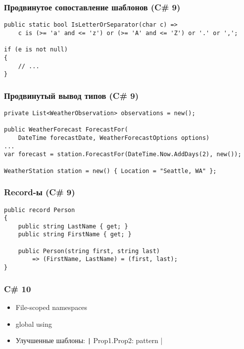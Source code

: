 \documentclass[xetex,mathserif,serif]{beamer}
\begin{document}
    \begin{frame}[fragile]
        \frametitle{Продвинутое сопоставление шаблонов (C\# 9)}
        \begin{verbatim}
public static bool IsLetterOrSeparator(char c) =>
    c is (>= 'a' and <= 'z') or (>= 'A' and <= 'Z') or '.' or ',';

if (e is not null)
{
    // ...
}
        \end{verbatim}
    \end{frame}

    \begin{frame}[fragile]
        \frametitle{Продвинутый вывод типов (C\# 9)}
        \begin{verbatim}
private List<WeatherObservation> observations = new();

public WeatherForecast ForecastFor(
    DateTime forecastDate, WeatherForecastOptions options)
...
var forecast = station.ForecastFor(DateTime.Now.AddDays(2), new());

WeatherStation station = new() { Location = "Seattle, WA" };
        \end{verbatim}
    \end{frame}

    \begin{frame}[fragile]
        \frametitle{Record-ы (C\# 9)}
        \begin{verbatim}
public record Person
{
    public string LastName { get; }
    public string FirstName { get; }

    public Person(string first, string last) 
        => (FirstName, LastName) = (first, last);
}
        \end{verbatim}
    \end{frame}

    \begin{frame}[fragile]
        \frametitle{C\# 10}
        \begin{itemize}
            \item File-scoped namespaces
            \item global using
            \item Улучшенные шаблоны: \texttt|{ Prop1.Prop2: pattern }|
        \end{itemize}
    \end{frame}
\end{document}
